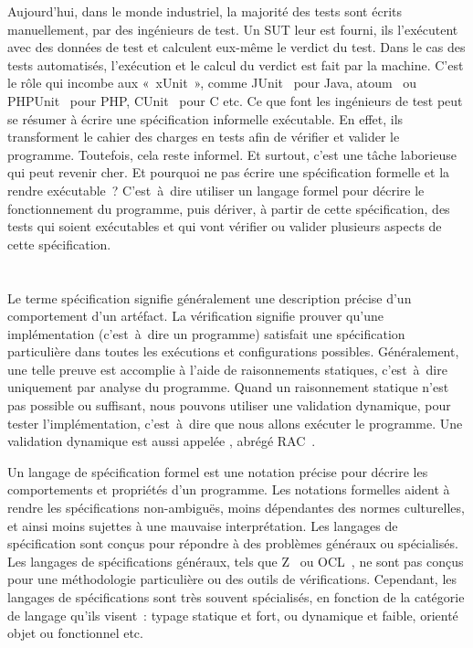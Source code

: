 Aujourd'hui, dans le monde industriel, la majorité des tests sont écrits
{\strong manuellement}, par des ingénieurs de test. Un SUT leur est fourni, ils
l'exécutent avec des données de test et calculent eux-même le verdict du test.
Dans le cas des tests {\strong automatisés}, l'exécution et le calcul du verdict
est fait par la machine. C'est le rôle qui incombe aux 
«~xUnit~», comme JUnit~ pour Java, atoum~ ou
PHPUnit~ pour PHP, CUnit~ pour C etc. Ce que font
les ingénieurs de test peut se résumer à écrire une spécification informelle
exécutable. En effet, ils transforment le cahier des charges en tests afin de
vérifier et valider le programme. Toutefois, cela reste informel. Et surtout,
c'est une tâche laborieuse qui peut revenir cher. Et pourquoi ne pas écrire une
spécification formelle et la rendre exécutable~? C'est~à~dire utiliser un
langage formel pour décrire le fonctionnement du programme, puis dériver, à
partir de cette spécification, des tests qui soient exécutables et qui vont
vérifier ou valider plusieurs aspects de cette spécification.

\section{}

Le terme {\strong spécification} signifie généralement une description précise
d'un comportement d'un artéfact. La {\strong vérification} signifie prouver
qu'une implémentation (c'est~à~dire un programme) satisfait une spécification
particulière dans toutes les exécutions et configurations possibles.
Généralement, une telle preuve est accomplie à l'aide de raisonnements
statiques, c'est~à~dire uniquement par analyse du programme. Quand un
raisonnement statique n'est pas possible ou suffisant, nous pouvons utiliser une
{\strong validation} dynamique, pour tester l'implémentation, c'est~à~dire que
nous allons exécuter le programme. Une validation dynamique est aussi appelée
, abrégé RAC~.

Un {\strong langage de spécification} formel est une notation précise pour
décrire les comportements et propriétés d'un programme. Les {\strong notations
formelles} aident à rendre les spécifications non-ambiguës, moins dépendantes
des normes culturelles, et ainsi moins sujettes à une mauvaise interprétation.
Les langages de spécification sont conçus pour répondre à des problèmes généraux
ou spécialisés. Les langages de spécifications généraux, tels que
Z~ ou OCL~, ne sont pas conçus pour une
méthodologie particulière ou des outils de vérifications. Cependant, les
langages de spécifications sont très souvent spécialisés, en fonction de la
catégorie de langage qu'ils visent~: typage statique et fort, ou dynamique et
faible, orienté objet ou fonctionnel etc.

